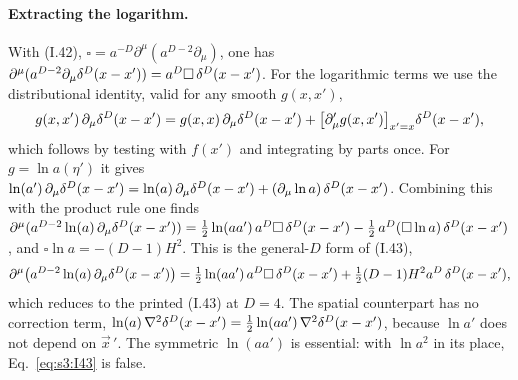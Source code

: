 \documentclass[aps,prd,onecolumn,10pt,nofootinbib,floatfix]{revtex4-2}
\newcommand{\eqI}[1]{(I.#1)}
\begin{document}
\paragraph*{Extracting the logarithm.}
With \eqI{42}, $\square=a^{-D}\partial^\mu(a^{D-2}\partial_\mu)$, one has
$\partial^\mu(a^{D-2}\partial_\mu\delta^D(x-x'))=a^D\square\,\delta^D(x-x')$. For the logarithmic terms we
use the distributional identity, valid for any smooth $g(x,x')$,
\begin{equation}\label{eq:s3:lemmaB}
g(x,x')\,\partial_\mu\delta^D(x-x')=g(x,x)\,\partial_\mu\delta^D(x-x')+\bigl[\partial'_\mu g(x,x')\bigr]_{x'=x}\delta^D(x-x') ,
\end{equation}
which follows by testing with $f(x')$ and integrating by parts once. For $g=\ln a(\eta')$ it
gives $\ln(a')\,\partial_\mu\delta^D(x-x')=\ln(a)\,\partial_\mu\delta^D(x-x')+(\partial_\mu\ln a)\,\delta^D(x-x')$.
Combining this with the product rule one finds
$\partial^\mu(a^{D-2}\ln(a)\,\partial_\mu\delta^D(x-x'))=\frac12\ln(aa')\,a^D\square\,\delta^D(x-x')
-\frac12\,a^D(\square\ln a)\,\delta^D(x-x')$, and $\square\ln a=-(D-1)H^2$. This is the general-$D$
form of \eqI{43},
\begin{equation}\label{eq:s3:I43}
\partial^\mu\bigl(a^{D-2}\ln(a)\,\partial_\mu\delta^D(x-x')\bigr)
=\tfrac12\ln(aa')\,a^D\square\,\delta^D(x-x')+\tfrac12(D-1)H^2a^D\,\delta^D(x-x') ,
\end{equation}
which reduces to the printed \eqI{43} at $D=4$. The spatial counterpart has no correction term,
$\ln(a)\,\nabla^2\delta^D(x-x')=\frac12\ln(aa')\,\nabla^2\delta^D(x-x')$, because $\ln a'$ does not
depend on $\vec x\,'$. The symmetric $\ln(aa')$ is essential: with $\ln a^2$ in its place,
Eq.~\eqref{eq:s3:I43} is false.
\end{document}
